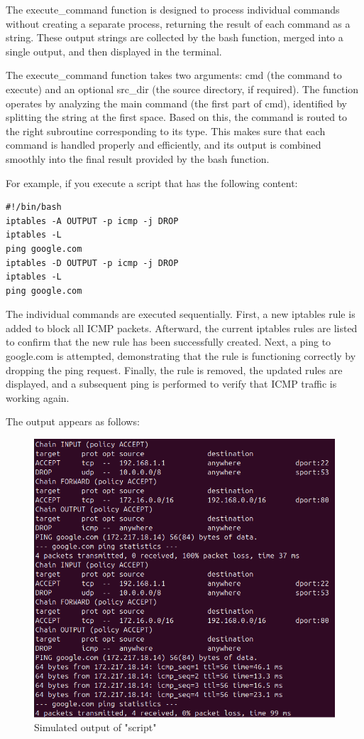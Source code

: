 The execute\_command function is designed to process individual commands without creating a separate process, returning the result of each command as a string. These output strings are collected by the bash function, merged into a single output, and then displayed in the terminal.

The execute\_command function takes two arguments: cmd (the command to execute) and an optional src\_dir (the source directory, if required). The function operates by analyzing the main command (the first part of cmd), identified by splitting the string at the first space. Based on this, the command is routed to the right subroutine corresponding to its type. This makes sure that each command is handled properly and efficiently, and its output is combined smoothly into the final result provided by the bash function.

For example, if you execute a script that has the following content:

\begin{lstlisting}
#!/bin/bash
iptables -A OUTPUT -p icmp -j DROP
iptables -L
ping google.com
iptables -D OUTPUT -p icmp -j DROP
iptables -L
ping google.com
\end{lstlisting}

The individual commands are executed sequentially. First, a new iptables rule is added to block all ICMP packets. Afterward, the current iptables rules are listed to confirm that the new rule has been successfully created. Next, a ping to google.com is attempted, demonstrating that the rule is functioning correctly by dropping the ping request. Finally, the rule is removed, the updated rules are displayed, and a subsequent ping is performed to verify that ICMP traffic is working again.

The output appears as follows:

\begin{figure}[H]
    \centering
    \includegraphics[width=1\linewidth]{bilder/script.PNG}
    \caption{Simulated output of "script"}
\end{figure}

